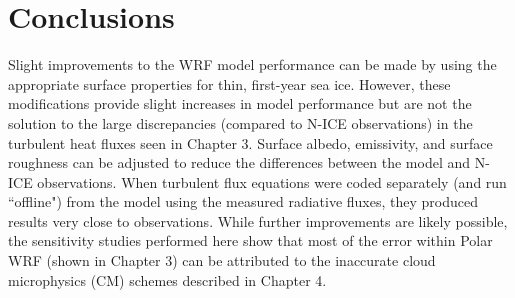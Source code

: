 \section{Conclusions}
Slight improvements to the WRF model performance can be made by using the appropriate surface properties for thin, first-year sea ice. However, these modifications provide slight increases in model performance but are not the solution to the large discrepancies (compared to N-ICE observations) in the turbulent heat fluxes seen in Chapter 3. Surface albedo, emissivity, and surface roughness can be adjusted to reduce the differences between the model and N-ICE observations. When turbulent flux equations were coded separately (and run ``offline") from the model using the measured radiative fluxes, they produced results very close to observations. While further improvements are likely possible, the sensitivity studies performed here show that most of the error within Polar WRF (shown in Chapter 3) can be attributed to the inaccurate cloud microphysics (CM) schemes described in Chapter 4. 

